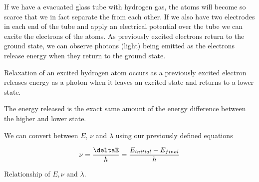 \documentclass[../mit-general-chemistry.tex]{subfiles}
\begin{document}
If we have a evacuated glass tube with hydrogen gas, the atoms will
become so scarce that we in fact separate the from each other. If we
also have two electrodes in each end of the tube and apply an
electrical potential over the tube we can excite the electrons of the
atoms. As previously excited electrons return to the ground state, we
can observe photons (light) being emitted as the electrons release
energy when they return to the ground state.


\begin{remark}
  Relaxation of an excited hydrogen atom occurs as a previously
  excited electron releases energy as a photon when it leaves an
  excited state and returns to a lower state.

  The energy released is the exact same amount of the energy
  difference between the higher and lower state.
\end{remark}


We can convert between $E$, $\nu$ and $\lambda$ using our previously
defined equations

\begin{align*}
  \nu &= \frac{\deltaE}{h} = \frac{E_{initial} - E_{final}}{h}\\
\end{align*}


Relationship of $E, \nu$ and $\lambda$.
\end{document}
